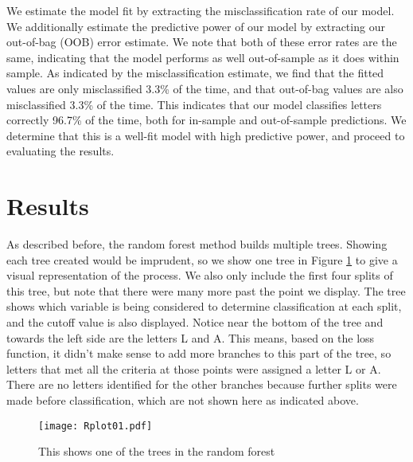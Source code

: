 \documentclass{svproc}
\begin{document}
We estimate the model fit by extracting the misclassification rate of our model. We additionally estimate the predictive power of our model by extracting our out-of-bag (OOB) error estimate. We note that both of these error rates are the same, indicating that the model performs as well out-of-sample as it does within sample. As indicated by the misclassification estimate, we find that the fitted values are only misclassified 3.3\% of the time, and that out-of-bag values are also misclassified 3.3\% of the time. This indicates that our model classifies letters correctly 96.7\% of the time, both for in-sample and out-of-sample predictions. We determine that this is a well-fit model with high predictive power, and proceed to evaluating the results.

\section{Results}

As described before, the random forest method builds multiple trees. Showing each tree created would be imprudent, so we show one tree in Figure \ref{tree} to give a visual representation of the process. We also only include the first four splits of this tree, but note that there were many more past the point we display. The tree shows which variable is being considered to determine classification at each split, and the cutoff value is also displayed. Notice near the bottom of the tree and towards the left side are the letters L and A. This means, based on the loss function, it didn't make sense to add more branches to this part of the tree, so letters that met all the criteria at those points were assigned a letter L or A. There are no letters identified for the other branches because further splits were made before classification, which are not shown here as indicated above. 

\begin{figure}
\begin{center}
\caption{This shows one of the trees in the random forest}
\texttt{[image: Rplot01.pdf]}
\label{tree}
\smallskip
\end{center}
\end{figure}
\end{document}
